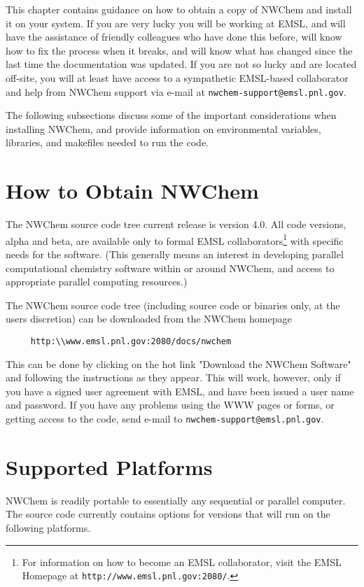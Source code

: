 \label{sec:install}

This chapter contains guidance on how to obtain a copy of NWChem and
install it on your system.  If you are very lucky you will be working
at EMSL, and will have the assistance of friendly colleagues who have
done this before, will know how to fix the process when it breaks,
and will know what has changed since the last time the documentation
was updated.
If you are not so lucky and are located off-site, you will at least have
access to a sympathetic EMSL-based collaborator and help from NWChem 
support via e-mail at {\tt nwchem-support@emsl.pnl.gov}.

The following subsections discuss some of the important considerations
when installing NWChem, and provide information on environmental
variables, libraries, and makefiles needed to run the code.

\section{How to Obtain NWChem}

The NWChem source code tree current release is version 4.0.  All code versions, alpha and
beta, are available only to formal EMSL collaborators\footnote{For information on
how to become an EMSL collaborator, visit the EMSL Homepage at 
\verb+http://www.emsl.pnl.gov:2080/+.} with specific
needs for the software.  (This generally means an interest in developing
parallel computational chemistry software within or around NWChem, and
access to appropriate parallel computing resources.)

The NWChem source code tree (including source code or binaries only, at the
users discretion) can be downloaded from the NWChem homepage 

\begin{verbatim}
     http:\\www.emsl.pnl.gov:2080/docs/nwchem
\end{verbatim}

This can be done by clicking on the hot link "Download the NWChem Software" and following the
instructions as they appear.  This will work, however, only if you have
a signed user agreement
with EMSL, and have been issued a user name and password.  If you have any problems
using the WWW pages or forms, or getting access to the code, send e-mail to
{\tt nwchem-support@emsl.pnl.gov}.

\section{Supported Platforms}
\label{sec:platforms}
NWChem is readily portable to essentially any sequential or parallel computer.  
The source code currently contains options for versions that will run
on the following platforms.

